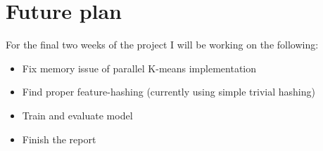 
\section{Future plan}

For the final two weeks of the project I will be working on the following:

\begin{itemize}
  \item Fix memory issue of parallel K-means implementation
  \item Find proper feature-hashing (currently using simple trivial hashing)
  \item Train and evaluate model
  \item Finish the report
\end{itemize}
